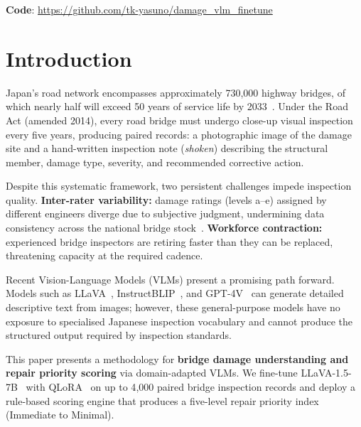 \documentclass[twocolumn]{article}
\begin{document}
\noindent
\textbf{Code}: \url{https://github.com/tk-yasuno/damage_vlm_finetune}

\section{Introduction}
\label{sec:introduction}

Japan's road network encompasses approximately 730{,}000 highway bridges,
of which nearly half will exceed 50 years of service life by
2033~\cite{mlit2023bridge}.
Under the Road Act (amended 2014), every road bridge must undergo close-up
visual inspection every five years, producing paired records: a photographic
image of the damage site and a hand-written inspection note (\textit{shoken})
describing the structural member, damage type, severity, and recommended
corrective action.

Despite this systematic framework, two persistent challenges impede inspection
quality.
\textbf{Inter-rater variability:} damage ratings (levels a--e) assigned by
different engineers diverge due to subjective judgment, undermining data
consistency across the national bridge stock~\cite{mlit2023bridge}.
\textbf{Workforce contraction:} experienced bridge inspectors are retiring
faster than they can be replaced, threatening capacity at the required cadence.

Recent Vision-Language Models (VLMs) present a promising path forward.
Models such as LLaVA~\cite{liu2024llava},
InstructBLIP~\cite{dai2023instructblip}, and GPT-4V~\cite{openai2023gpt4}
can generate detailed descriptive text from images; however, these
general-purpose models have no exposure to specialised Japanese inspection
vocabulary and cannot produce the structured output required by inspection
standards.

This paper presents a methodology for \textbf{bridge damage understanding and
repair priority scoring} via domain-adapted VLMs.
We fine-tune LLaVA-1.5-7B~\cite{liu2024llava} with
QLoRA~\cite{dettmers2023qlora} on up to 4{,}000 paired bridge inspection
records and deploy a rule-based scoring engine that produces a five-level
repair priority index (Immediate to Minimal).
\end{document}
